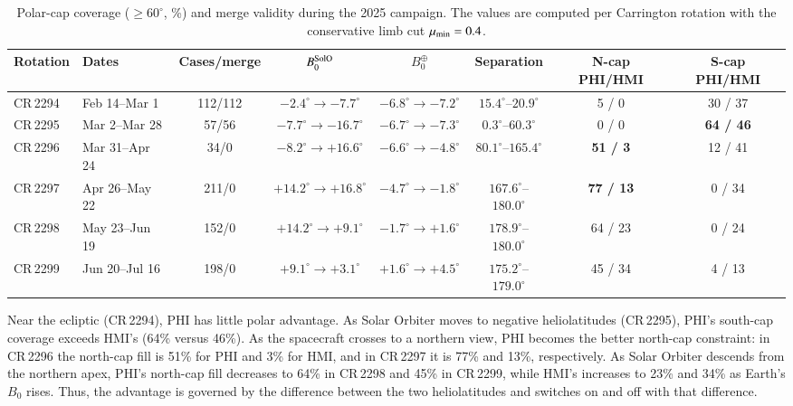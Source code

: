 \documentclass{aa}
\begin{document}
\begin{table}
\caption{Polar-cap coverage ($\ge60^{\circ}$, \%) and merge validity during the 2025 campaign. The values are computed per Carrington rotation with the conservative limb cut $\mu_{\rm min}=0.4$.}
\label{tab:campaign}
\centering
\scriptsize
\begin{tabular}{llcccccc}
\hline\hline
Rotation & Dates & Cases/merge & $B_0^{\rm SolO}$ & $B_0^{\oplus}$ & Separation & N-cap PHI/HMI & S-cap PHI/HMI \\
\hline
CR\,2294 & Feb 14--Mar 1  & 112/112 & $-2.4^{\circ}\rightarrow -7.7^{\circ}$  & $-6.8^{\circ}\rightarrow -7.2^{\circ}$  & $15.4^{\circ}$--$20.9^{\circ}$   & 5 / 0   & 30 / 37 \\
CR\,2295 & Mar 2--Mar 28  & 57/56   & $-7.7^{\circ}\rightarrow -16.7^{\circ}$ & $-6.7^{\circ}\rightarrow -7.3^{\circ}$  & $0.3^{\circ}$--$60.3^{\circ}$  & 0 / 0   & \textbf{64 / 46} \\
CR\,2296 & Mar 31--Apr 24 & 34/0    & $-8.2^{\circ}\rightarrow +16.6^{\circ}$ & $-6.6^{\circ}\rightarrow -4.8^{\circ}$  & $80.1^{\circ}$--$165.4^{\circ}$  & \textbf{51 / 3}  & 12 / 41 \\
CR\,2297 & Apr 26--May 22 & 211/0   & $+14.2^{\circ}\rightarrow +16.8^{\circ}$ & $-4.7^{\circ}\rightarrow -1.8^{\circ}$ & $167.6^{\circ}$--$180.0^{\circ}$ & \textbf{77 / 13} & 0 / 34 \\
CR\,2298 & May 23--Jun 19 & 152/0   & $+14.2^{\circ}\rightarrow +9.1^{\circ}$  & $-1.7^{\circ}\rightarrow +1.6^{\circ}$ & $178.9^{\circ}$--$180.0^{\circ}$ & 64 / 23 & 0 / 24 \\
CR\,2299 & Jun 20--Jul 16 & 198/0   & $+9.1^{\circ}\rightarrow +3.1^{\circ}$   & $+1.6^{\circ}\rightarrow +4.5^{\circ}$ & $175.2^{\circ}$--$179.0^{\circ}$  & 45 / 34 & 4 / 13 \\
\hline
\end{tabular}
\end{table}

Near the ecliptic (CR\,2294), PHI has little polar advantage. As Solar Orbiter moves to negative heliolatitudes (CR\,2295), PHI's south-cap coverage exceeds HMI's (64\% versus 46\%). As the spacecraft crosses to a northern view, PHI becomes the better north-cap constraint: in CR\,2296 the north-cap fill is 51\% for PHI and 3\% for HMI, and in CR\,2297 it is 77\% and 13\%, respectively. As Solar Orbiter descends from the northern apex, PHI's north-cap fill decreases to 64\% in CR\,2298 and 45\% in CR\,2299, while HMI's increases to 23\% and 34\% as Earth's $B_0$ rises. Thus, the advantage is governed by the difference between the two heliolatitudes and switches on and off with that difference.
\end{document}
